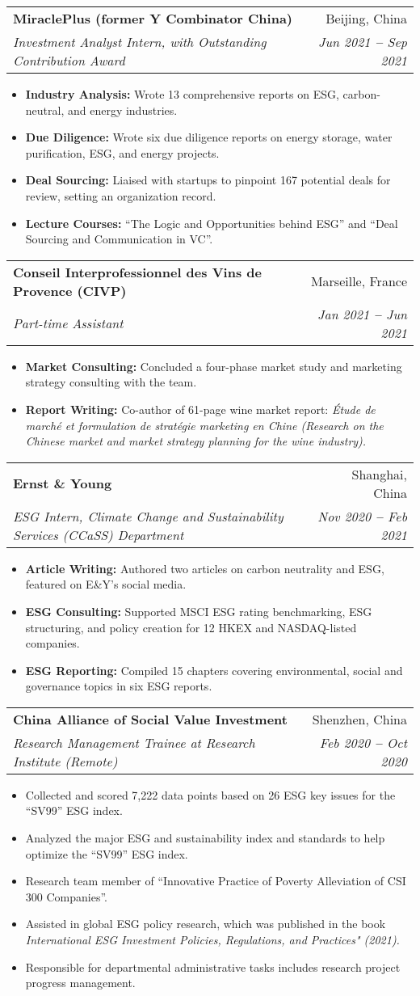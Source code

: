 \documentclass[letterpaper,11pt]{article}
\makeatletter
\newcommand{\resumeItem}[1]{
  \item\small{
    {#1 \vspace{-2pt}}
  }
}
\newcommand{\resumeSubheading}[4]{
  \vspace{-2pt}\item
    \begin{tabular*}{0.97\textwidth}[t]{l@{\extracolsep{\fill}}r}
      \textbf{#1} & #2 \\
      \textit{\small#3} & \textit{\small #4} \\
    \end{tabular*}\vspace{-7pt}
}
\newcommand{\resumeItemListStart}{\begin{itemize}}
\newcommand{\resumeItemListEnd}{\end{itemize}\vspace{-5pt}}
\makeatother
\begin{document}
    \resumeSubheading
      {MiraclePlus (former Y Combinator China)}{Beijing, China}
      {Investment Analyst Intern, with Outstanding Contribution Award}{Jun 2021 \textbf{--} Sep 2021}
        \resumeItemListStart
            \resumeItem{\textbf{Industry Analysis:} Wrote 13 comprehensive reports on ESG, carbon-neutral, and energy industries.}
            \resumeItem{\textbf{Due Diligence:} Wrote six due diligence reports on energy storage, water purification, ESG, and energy projects.}
            \resumeItem{\textbf{Deal Sourcing:} Liaised with startups to pinpoint 167 potential deals for review, setting an organization record.}
            \resumeItem{\textbf{Lecture Courses:} “The Logic and Opportunities behind ESG” and “Deal Sourcing and Communication in VC”.}
        \resumeItemListEnd
        
    \resumeSubheading
      {Conseil Interprofessionnel des Vins de Provence (CIVP)}{Marseille, France}
      {Part-time Assistant}{Jan 2021 \textbf{--} Jun 2021}
        \resumeItemListStart
            \resumeItem{\textbf{Market Consulting:} Concluded a four-phase market study and marketing strategy consulting with the team.}
            \resumeItem{\textbf{Report Writing:} Co-author of 61-page wine market report: \textit{Étude de marché et formulation de stratégie marketing en Chine (Research on the Chinese market and market strategy planning for the wine industry).}}
        \resumeItemListEnd

    \resumeSubheading
      {Ernst \& Young}{Shanghai, China}
      {ESG Intern, Climate Change and Sustainability Services (CCaSS) Department}{Nov 2020 \textbf{--} Feb 2021}
        \resumeItemListStart
            \resumeItem{\textbf{Article Writing:} Authored two articles on carbon neutrality and ESG, featured on E\&Y’s social media.}
            \resumeItem{\textbf{ESG Consulting:} Supported MSCI ESG rating benchmarking, ESG structuring, and policy creation for 12 HKEX and NASDAQ-listed companies.}
            \resumeItem{\textbf{ESG Reporting:} Compiled 15 chapters covering environmental, social and governance topics in six ESG reports.}
        \resumeItemListEnd
        
     \resumeSubheading
        {China Alliance of Social Value Investment}{Shenzhen, China}
        {Research Management Trainee at Research Institute (Remote)}{Feb 2020 \textbf{--} Oct 2020}
        \resumeItemListStart
            \resumeItem{Collected and scored 7,222 data points based on 26 ESG key issues for the “SV99” ESG index.}
            \resumeItem{Analyzed the major ESG and sustainability index and standards to help optimize the “SV99” ESG index.}
            \resumeItem{Research team member of “Innovative Practice of Poverty Alleviation of CSI 300 Companies”.}
            \resumeItem{Assisted in global ESG policy research, which was published in the book \textit{International ESG Investment Policies, Regulations, and Practices" (2021).}}
            \resumeItem{Responsible for departmental administrative tasks includes research project progress management.}
        \resumeItemListEnd
        
\end{document}
